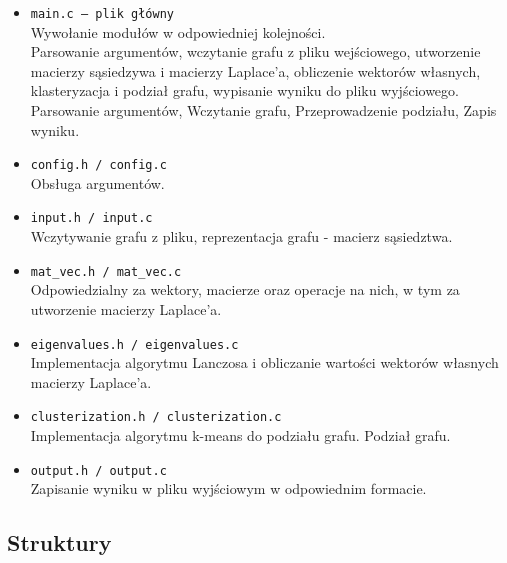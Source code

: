 \documentclass{article}
\begin{document}
    \begin{itemize}
        \item \texttt{main.c — plik główny} \\
        Wywołanie modułów w odpowiedniej kolejności. \\
        Parsowanie argumentów, wczytanie grafu z pliku wejściowego, utworzenie macierzy sąsiedzywa i macierzy Laplace'a, obliczenie wektorów własnych, klasteryzacja i podział grafu, wypisanie wyniku do pliku wyjściowego.
        Parsowanie argumentów, Wczytanie grafu, Przeprowadzenie podziału, Zapis wyniku.
        \item \texttt{config.h / config.c} \\
        Obsługa argumentów.
        \item \texttt{input.h / input.c} \\
        Wczytywanie grafu z pliku, reprezentacja grafu - macierz sąsiedztwa.
        \item \texttt{mat\_vec.h / mat\_vec.c} \\
        Odpowiedzialny za wektory, macierze oraz operacje na nich, w tym za utworzenie macierzy Laplace'a.
        \item \texttt{eigenvalues.h / eigenvalues.c} \\
        Implementacja algorytmu Lanczosa i obliczanie wartości wektorów własnych macierzy Laplace'a.
        \item \texttt{clusterization.h / clusterization.c} \\
        Implementacja algorytmu k-means do podziału grafu. Podział grafu.
        \item \texttt{output.h / output.c} \\
        Zapisanie wyniku w pliku wyjściowym w odpowiednim formacie.
    \end{itemize}



    \subsection{Struktury}
    
\end{document}
